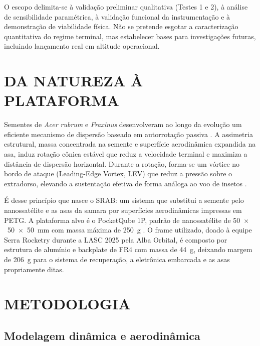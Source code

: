 \documentclass[12pt,fleqn]{article}
\begin{document}
O escopo delimita-se à validação preliminar qualitativa (Testes 1 e 2), à análise de sensibilidade paramétrica, à validação funcional da instrumentação e à demonstração de viabilidade física. Não se pretende esgotar a caracterização quantitativa do regime terminal, mas estabelecer bases para investigações futuras, incluindo lançamento real em altitude operacional.


\section{DA NATUREZA À PLATAFORMA}

Sementes de \textit{Acer rubrum} e \textit{Fraxinus} desenvolveram ao longo da evolução um eficiente mecanismo de dispersão baseado em autorrotação passiva \citep{limacher2015, european2009}. A assimetria estrutural, massa concentrada na semente e superfície aerodinâmica expandida na asa, induz rotação cônica estável que reduz a velocidade terminal e maximiza a distância de dispersão horizontal. Durante a rotação, forma-se um vórtice no bordo de ataque (Leading-Edge Vortex, LEV) que reduz a pressão sobre o extradorso, elevando a sustentação efetiva de forma análoga ao voo de insetos \citep{lentink2009, mcconnell2023, rezgui2020}.

É desse princípio que nasce o SRAB: um sistema que substitui a semente pelo nanossatélite e as asas da samara por superfícies aerodinâmicas impressas em PETG. A plataforma alvo é o PocketQube 1P, padrão de nanossatélite de 50~$\times$~50~$\times$~50~mm com massa máxima de 250~g \citep{lasc2026}. O frame utilizado, doado à equipe Serra Rocketry durante a LASC 2025 pela Alba Orbital, é composto por estrutura de alumínio e backplate de FR4 com massa de 44~g, deixando margem de 206~g para o sistema de recuperação, a eletrônica embarcada e as asas propriamente ditas.


\section{METODOLOGIA}

\subsection{Modelagem dinâmica e aerodinâmica}
\end{document}
